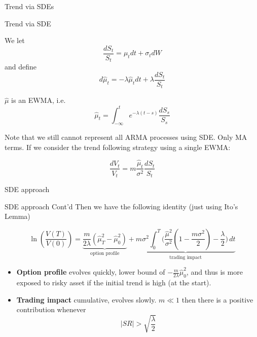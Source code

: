 \begin{frame}{Trend via SDEs}

\begin{alertblock}{Trend via SDE}


We let 
    $$\frac{dS_t}{S_t} = \mu_t dt + \sigma_t dW$$
and define
$$d \hat{\mu}_t = -\lambda \hat{\mu }_tdt +\lambda \frac{dS_t}{S_t}$$

$\hat{\mu}$ is an EWMA, i.e. 
$$\hat{\mu}_t=\int_{-\infty}^t e^{-\lambda(t-s)}\frac{dS_s}{S_s}$$

Note that we still cannot represent all ARMA processes using SDE. Only MA terms. 
If we consider the trend following strategy using a single EWMA:

$$\frac{dV_t}{V_t} = m\frac{\hat{\mu}_t}{\sigma^2}\frac{dS_t}{S_t} $$ 


\end{alertblock}
\end{frame}


\begin{frame}{SDE approach}
\begin{alertblock}{SDE approach Cont'd}
Then we have the following identity (just using Ito's Lemma)



$$\ln(\frac{V(T)}{V(0)}) = \underbrace{\frac{m}{2\lambda}(\hat{\mu}_{T}^2-\hat{\mu}_{0}^2 )}_\text{option profile} + \underbrace{m\sigma^2 \int_{0}^T\bigl(\frac{\hat{\mu}^2}{\sigma^2}(1-\frac{m\sigma^2}{2}) - \frac{\lambda}{2}\bigr)  \, dt}_\text{trading impact} $$

\begin{itemize}
    \item {\bf Option profile} evolves quickly, lower bound of $-\frac{m}{2\lambda}\hat{\mu}^2_0$, and thus is more exposed to risky asset  if the initial trend is high (at the start).
    \item {\bf Trading impact} cumulative, evolves slowly. $m\ll 1$ then there is a positive contribution whenever $$|SR|> \sqrt{\frac{\lambda}{2}}$$
\end{itemize}
\end{alertblock}
\end{frame}

